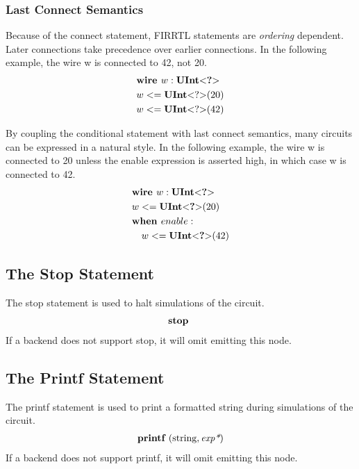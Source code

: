 \documentclass[12pt]{article}
\begin{document}
\subsubsection{Last Connect Semantics}
Because of the connect statement, FIRRTL statements are {\em ordering} dependent.
Later connections take precedence over earlier connections.
In the following example, the wire w is connected to 42, not 20. 
\[
\begin{aligned}
&\text{\bf wire\ } w : \text{\bf UInt}\text{\bf $<$} \text{\bf ?} \text{\bf $>$} \\
&w <= \text{\bf UInt}\text{\bf $<$} ? \text{\bf $>$}(20) \\
&w <= \text{\bf UInt}\text{\bf $<$} ? \text{\bf $>$}(42) \\
\end{aligned}
\]

By coupling the conditional statement with last connect semantics, many circuits can be expressed in a natural style.
In the following example, the wire w is connected to 20 unless the enable expression is asserted high, in which case w is connected to 42. 
\[
\begin{aligned}
&\text{\bf wire\ } w : \text{\bf UInt}\text{\bf $<$} \text{\bf ?} \text{\bf $>$} \\
&w <= \text{\bf UInt}\text{\bf $<$} \text{\bf ?} \text{\bf $>$}(20) \\
&\text{\bf when\ } enable : \\
&\quad w <= \text{\bf UInt}\text{\bf $<$} \text{\bf ?} \text{\bf $>$}(42) \\
\end{aligned}
\]

\subsection{The Stop Statement}
The stop statement is used to halt simulations of the circuit.
\[
\begin{aligned}
\text{\bf stop\ }
\end{aligned}
\]
If a backend does not support stop, it will omit emitting this node.

\subsection{The Printf Statement}
The printf statement is used to print a formatted string during simulations of the circuit.
\[
\begin{aligned}
\text{\bf printf\ }(\text{string},\text{\em exp*})
\end{aligned}
\] 
If a backend does not support printf, it will omit emitting this node.
\end{document}
